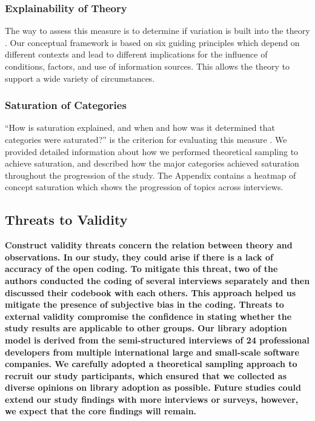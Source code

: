 \subsubsection{Explainability of Theory} The way to assess this measure is to determine if variation is built into the theory \cite{corbin2014gt}. Our conceptual framework is based on six guiding principles which depend on different contexts and lead to different implications for the influence of conditions, factors, and use of information sources. This allows the theory to support a wide variety of circumstances.

\subsubsection{Saturation of Categories} ``How is saturation explained, and when and how was it determined that categories were saturated?'' is the criterion for evaluating this measure \cite{corbin2014gt}. We provided detailed information about how we performed theoretical sampling to achieve saturation, and described how the major categories achieved saturation throughout the progression of the study. The Appendix contains a heatmap of concept saturation which shows the progression of topics across interviews.

\subsection{Threats to Validity}
\bf{Construct validity} threats concern the relation between theory
and observations. In our study, they could arise if there is a lack of accuracy of the open coding. To mitigate this threat, two of the authors conducted the coding of several interviews separately and then discussed their codebook with each others. This approach helped us mitigate the presence of subjective bias in the coding. Threats to \bf{external validity} compromise the confidence in
stating whether the study results are applicable to other
groups. Our library adoption model is derived from the semi-structured interviews of 24 professional developers from multiple international large and small-scale software companies. We carefully adopted a theoretical sampling approach to recruit our study participants, which ensured that we collected as diverse opinions on library adoption as possible. Future studies could extend our study findings with more interviews or surveys, however, we expect that the core findings will remain.


